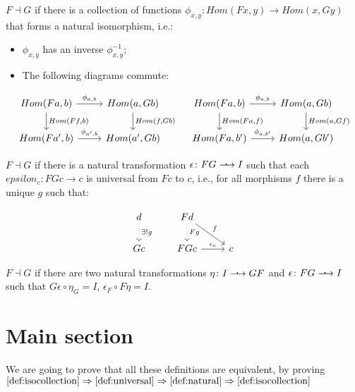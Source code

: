 \documentclass[]{article}
\newcommand{\dotarrow}{%
	\mathrel{\ooalign{\hss\raise.65ex\hbox{\scalebox{1.25}{\normalfont .}}%
	\kern0.35ex\hss\cr$\longrightarrow$}}}
\begin{document}
\begin{definition}\label{def:isocollection}

$F \dashv G$ if there is a collection of functions $\phi_{x,y} \colon Hom(F x, y) \to Hom(x, G y)$ that forms a natural isomorphism, i.e.:
	
\begin{itemize}
	\item $\phi_{x,y}$ has an inverse $\phi^{-1}_{x,y}$;
	\item The following diagrams commute:
\end{itemize}
\[
\begin{tikzcd}
    Hom(Fa, b) \arrow[r, "\phi_{a,b}"] \arrow[d, "{Hom(Ff,b)}"] & Hom(a, Gb) \arrow[d, "{Hom(f, Gb)}"] & Hom(Fa, b) \arrow[r, "\phi_{a,b}"] \arrow[d, "{Hom(Fa,f)}"] & Hom(a, Gb) \arrow[d, "{Hom(a, Gf)}"] 
    \\ Hom(Fa', b) \arrow[r, "\phi_{a',b}"] & Hom(a', Gb) & Hom(Fa, b') \arrow[r, "\phi_{a,b'}"] & Hom(a, Gb')
\end{tikzcd}
\]
\end{definition}
\begin{definition}\label{def:universal}
	
	$F \dashv G$ if there is a natural transformation $\epsilon \colon FG \dotarrow I$ such that each $epsilon_c \colon FGc \to c$ is universal from $Fc$ to $c$, i.e., for all morphisms $f$ there is a unique $g$ such that:
\end{definition}
\[
\begin{tikzcd}
	d \arrow[d, dotted, "\exists! g"] & F d \arrow[d, dotted, "F g"] \arrow[rd, "f"] \\ Gc & FGc \arrow[r, "\epsilon_c"] & c
\end{tikzcd}
\]
\begin{definition}\label{def:natural}
	
$F \dashv G$ if there are two natural transformations
$\eta \colon I \dotarrow GF$ and $\epsilon \colon FG \dotarrow I$ such that $G\epsilon \circ \eta_G = I$, $\epsilon_F \circ F\eta = I$.
\end{definition}

\section{Main section}

We are going to prove that all these definitions are equivalent, by proving $ \cref{def:isocollection} \Rightarrow \cref{def:universal} \Rightarrow \cref{def:natural} \Rightarrow \cref{def:isocollection}$
\end{document}

